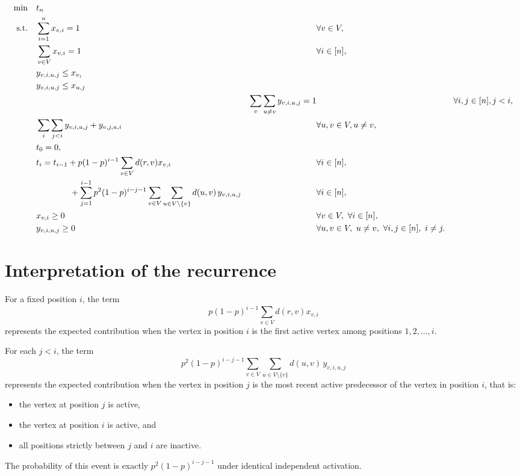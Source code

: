 \documentclass[11pt]{article}
\begin{document}
\begin{alignat}{2}
\min \quad & t_n \label{obj}\\
\text{s.t.}\quad
& \sum_{i=1}^n x_{v,i} = 1 && \forall v \in V, \label{assign-vertex}\\
& \sum_{v \in V} x_{v,i} = 1 && \forall i \in [n], \label{assign-position}\\
& y_{v,i,u,j} \le x_{v_i} \\
& y_{v,i,u,j} \le x_{u,j} \\
& 
& \sum_{v} \sum_{u \neq v} y_{v,i,u,j} = 1 && \forall i,j \in [n], j < i, \label{forallij}\\
& \sum_{i} \sum_{j < i} y_{v,i,u,j}  + y_{v,j,u,i} && \forall u,v \in V, u \neq v, \label{foralluv}\\
& t_0 = 0, \label{t0}\\
& t_i = t_{i-1} + p(1-p)^{i-1}\sum_{v \in V} d(r,v)x_{v,i} 
   && \forall i \in [n], \label{ti-main}\\
& \hspace{4em} + \sum_{j=1}^{i-1} p^2(1-p)^{i-j-1}
   \sum_{v \in V}\sum_{u \in V \setminus \{v\}} d(u,v)\, y_{v,i,u,j}
   && \forall i \in [n], \notag\\
& x_{v,i} \ge 0 && \forall v \in V,\ \forall i \in [n], \label{xnonneg}\\
& y_{v,i,u,j} \ge 0 && \forall u,v \in V,\ u \neq v,\ \forall i,j \in [n],\ i \neq j. \label{ynonneg}
\end{alignat}


\section*{Interpretation of the recurrence}
For a fixed position $i$, the term
\[
p(1-p)^{i-1}\sum_{v \in V} d(r,v)x_{v,i}
\]
represents the expected contribution when the vertex in position $i$ is the first active vertex among positions $1,2,\dots,i$.

For each $j < i$, the term
\[
p^2(1-p)^{i-j-1}
\sum_{v \in V}\sum_{u \in V \setminus \{v\}} d(u,v)\, y_{v,i,u,j}
\]
represents the expected contribution when the vertex in position $j$ is the most recent active predecessor of the vertex in position $i$, that is:
\begin{itemize}[leftmargin=1.5em]
    \item the vertex at position $j$ is active,
    \item the vertex at position $i$ is active, and
    \item all positions strictly between $j$ and $i$ are inactive.
\end{itemize}
The probability of this event is exactly $p^2(1-p)^{i-j-1}$ under identical independent activation.
\end{document}
